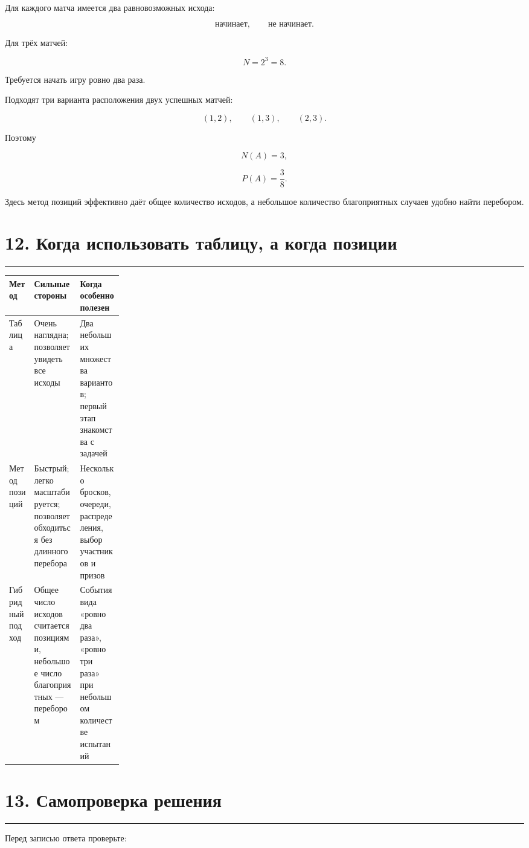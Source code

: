 \documentclass[a4paper,12pt]{article}
\newcommand{\sectionline}{%
    \vspace{0.2em}
    {\color{accent}\rule{\linewidth}{0.7pt}}
    \vspace{0.4em}
}
\begin{document}
Для каждого матча имеется два равновозможных исхода:

\[
\text{начинает},\qquad
\text{не начинает}.
\]

Для трёх матчей:

\[
N=2^3=8.
\]

Требуется начать игру ровно два раза.

Подходят три варианта расположения двух успешных матчей:

\[
(1,2),\qquad
(1,3),\qquad
(2,3).
\]

Поэтому

\[
N(A)=3,
\]

\[
\boxed{
P(A)=\frac38
}.
\]

Здесь метод позиций эффективно даёт общее количество исходов, а небольшое количество благоприятных случаев удобно найти перебором.

\newpage

\section*{12. Когда использовать таблицу, а когда позиции}
\sectionline

\begin{center}
\renewcommand{\arraystretch}{1.35}
\begin{tabularx}{\linewidth}{@{}p{0.22\linewidth}XX@{}}
\toprule
Метод & Сильные стороны & Когда особенно полезен \\
\midrule
Таблица
&
Очень наглядна; позволяет увидеть все исходы
&
Два небольших множества вариантов; первый этап знакомства с задачей
\\
\addlinespace
Метод позиций
&
Быстрый; легко масштабируется; позволяет обходиться без длинного перебора
&
Несколько бросков, очереди, распределения, выбор участников и призов
\\
\addlinespace
Гибридный подход
&
Общее число исходов считается позициями, небольшое число благоприятных --- перебором
&
События вида «ровно два раза», «ровно три раза» при небольшом количестве испытаний
\\
\bottomrule
\end{tabularx}
\end{center}

\section*{13. Самопроверка решения}
\sectionline

Перед записью ответа проверьте:
\end{document}
